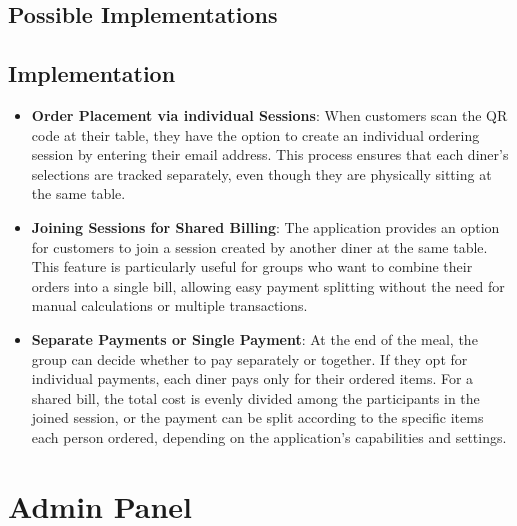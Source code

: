 \subsection*{Possible Implementations}


\subsection{Implementation}
\begin{itemize}
    \item \textbf{Order Placement via individual Sessions}: When customers scan the QR code at their table, they have the option to create an individual ordering session by entering their email address. This process ensures that each diner's selections are tracked separately, even though they are physically sitting at the same table.
    \item \textbf{Joining Sessions for Shared Billing}: The application provides an option for customers to join a session created by another diner at the same table. This feature is particularly useful for groups who want to combine their orders into a single bill, allowing easy payment splitting without the need for manual calculations or multiple transactions.
    \item \textbf{Separate Payments or Single Payment}: At the end of the meal, the group can decide whether to pay separately or together. If they opt for individual payments, each diner pays only for their ordered items. For a shared bill, the total cost is evenly divided among the participants in the joined session, or the payment can be split according to the specific items each person ordered, depending on the application's capabilities and settings.
\end{itemize}

\section{Admin Panel}
